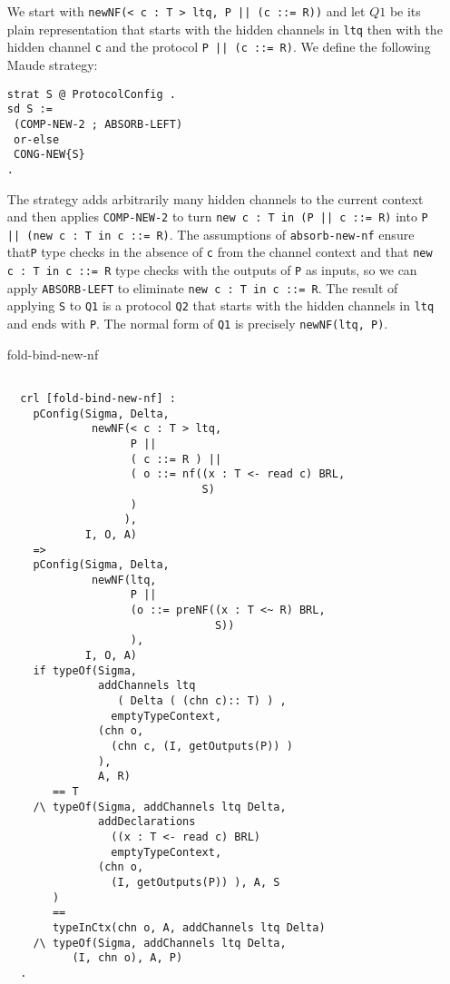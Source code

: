 \documentclass{article}
\begin{document}
\begin{itemize}
We start with 
\verb+newNF(< c : T > ltq, P || (c ::= R))+  
and let $Q1$ be its plain representation that starts with
the hidden channels in \verb+ltq+ then with the hidden channel \verb+c+ and
the protocol \verb+P || (c ::= R)+.
We define the following Maude strategy:
\begin{lstlisting}
strat S @ ProtocolConfig .
sd S := 
 (COMP-NEW-2 ; ABSORB-LEFT)
 or-else
 CONG-NEW{S}
.
\end{lstlisting}

 The strategy adds arbitrarily many hidden channels to the current context
 and then applies \verb+COMP-NEW-2+ to turn
 \verb+new c : T in (P || c ::= R)+ into
 \verb+P || (new c : T in c ::= R)+. The assumptions of 
 \verb+absorb-new-nf+ ensure that\verb+P+ type checks in the absence of
 \verb+c+ from the channel context and that 
 \verb+new c : T in c ::= R+ type checks with the outputs of \verb+P+
 as inputs, so we can apply \verb+ABSORB-LEFT+ to eliminate
 \verb+new c : T in c ::= R+. The result of applying 
 \verb+S+ to \verb+Q1+ is a protocol \verb+Q2+ that starts with 
 the hidden channels in \verb+ltq+ and ends with \verb+P+.
 The normal form of \verb+Q1+ is precisely \verb+newNF(ltq, P)+.
 
\item[fold-bind-new-nf]
 \begin{lstlisting}
           
  crl [fold-bind-new-nf] :
    pConfig(Sigma, Delta, 
             newNF(< c : T > ltq, 
                   P || 
                   ( c ::= R ) || 
                   ( o ::= nf((x : T <- read c) BRL, 
                              S) 
                   )
                  ),
            I, O, A)
    => 
    pConfig(Sigma, Delta, 
             newNF(ltq, 
                   P || 
                   (o ::= preNF((x : T <~ R) BRL, 
                                S))
                   ),
            I, O, A) 
    if typeOf(Sigma, 
              addChannels ltq 
                 ( Delta ( (chn c):: T) ) , 
                emptyTypeContext, 
              (chn o, 
                (chn c, (I, getOutputs(P)) ) 
              ), 
              A, R) 
       == T 
    /\ typeOf(Sigma, addChannels ltq Delta, 
              addDeclarations 
                ((x : T <- read c) BRL) 
                emptyTypeContext,
              (chn o, 
                (I, getOutputs(P)) ), A, S
       ) 
       == 
       typeInCtx(chn o, A, addChannels ltq Delta)   
    /\ typeOf(Sigma, addChannels ltq Delta, 
          (I, chn o), A, P)     
  .
    \end{lstlisting}
    

\end{itemize}
\end{document}
